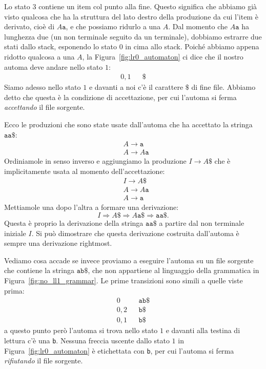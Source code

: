 Lo stato $3$ contiene un item col punto alla fine. Questo significa che
abbiamo gi\`a visto qualcosa che ha la struttura del lato destro della
produzione da cui l'item \`e derivato, cio\`e di $A\mathtt{a}$, e che possiamo
ridurlo a una $A$. Dal momento che $A\mathtt{a}$ ha lunghezza due
(un non terminale seguito da un terminale), dobbiamo estrarre due stati
dallo stack, esponendo lo stato $0$ in cima allo stack.
Poich\'e abbiamo appena ridotto qualcosa a una
$A$, la Figura~\ref{fig:lr0_automaton} ci dice che il nostro automa deve
andare nello stato $1$:
\begin{align*}
  0,1 & & \mathtt{\$}
\end{align*}
Siamo adesso nello stato $1$ e davanti a noi c'\`e il carattere
$\mathtt{\$}$ di fine file. Abbiamo detto che questa \`e la condizione
di accettazione, per cui l'automa si ferma \emph{accettando} il file sorgente.

Ecco le produzioni che sono state usate dall'automa che ha accettato la
stringa $\mathtt{aa\$}$:
\begin{align*}
&A\to\mathtt{a}\\
&A\to A\mathtt{a}
\end{align*}
Ordiniamole in senso inverso e aggiungiamo la produzione $I\to A\mathtt{\$}$
che \`e implicitamente usata al momento dell'accettazione:
\begin{align*}
&I\to A\mathtt{\$}\\
&A\to A\mathtt{a}\\
&A\to\mathtt{a}
\end{align*}
Mettiamole una dopo l'altra a formare una derivazione:
\[
 I\Rightarrow A\mathtt{\$}\Rightarrow A\mathtt{a\$}\Rightarrow
   \mathtt{aa\$}.
\]
Questa \`e proprio la derivazione della stringa $\mathtt{aa\$}$ a partire
dal non terminale iniziale $I$. Si pu\`o dimostrare che questa derivazione
costruita dall'automa \`e sempre una derivazione rightmost.

Vediamo cosa accade se invece proviamo a eseguire l'automa su un file
sorgente che contiene la stringa $\mathtt{ab\$}$, che non appartiene al
linguaggio della grammatica in Figura~\ref{fig:no_ll1_grammar}. Le prime
transizioni sono simili a quelle viste prima:
%
\begin{align*}
  0 & & \mathtt{ab\$}\\
  0,2 & & \mathtt{b\$}\\
  0,1 & & \mathtt{b\$}
\end{align*}
%
a questo punto per\`o l'automa si trova nello stato $1$ e davanti alla
testina di lettura c'\`e una \texttt{b}. Nessuna freccia uscente dallo
stato $1$ in
Figura~\ref{fig:lr0_automaton} \`e etichettata con \texttt{b}, per cui
l'automa si ferma \emph{rifiutando} il file sorgente.

